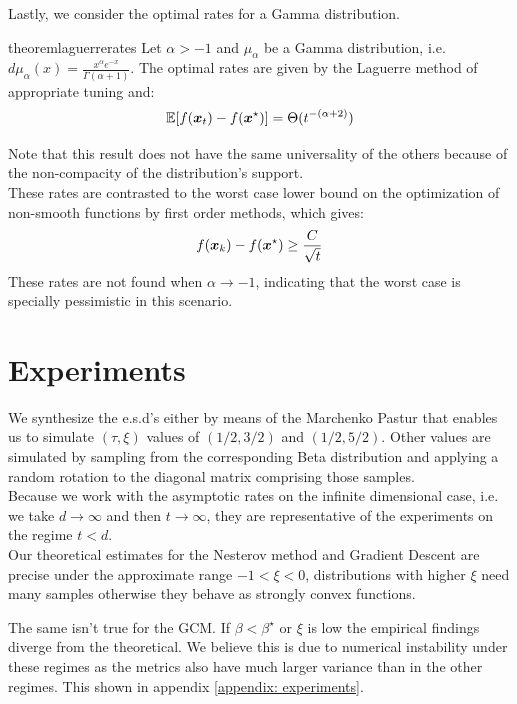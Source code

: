 \documentclass{article}
\begin{document}
Lastly, we consider the optimal rates for a Gamma distribution.

\begin{restatable}{theorem}{laguerrerates}
Let $\alpha>-1$ and $\mu_\alpha$ be a Gamma distribution, i.e. $d\mu_\alpha(x)=\frac{x^\alpha e^{-x}}{\Gamma(\alpha+1)}$. The optimal rates are given by the Laguerre method of appropriate tuning and:
\begin{equation}
    \mathbb{E}[f({\boldsymbol x}_t)-f({\boldsymbol x}^\star)]=\Theta(t^{-(\alpha+2)})
\end{equation}
\end{restatable}
Note that this result does not have the same universality of the others because of the non-compacity of the distribution's support.\\
These rates are contrasted  to the worst case lower bound on the optimization of non-smooth functions by first order methods, which gives:
\begin{equation*}
    f({\boldsymbol x}_k)-f({\boldsymbol x}^\star)\geq\frac{C}{\sqrt{t}}
\end{equation*}
These rates are not found when $\alpha\rightarrow-1$, indicating that the worst case is specially pessimistic in this scenario.


\section{Experiments}

We synthesize the e.s.d's  either by means of the Marchenko Pastur that enables us to simulate $(\tau,\xi)$ values of $(1/2,3/2)$ and $(1/2,5/2)$. Other values are simulated by sampling from the corresponding Beta distribution and applying a random rotation to the diagonal matrix comprising those samples.\\ 
Because we work with the asymptotic rates on the infinite dimensional case, i.e. we take $d\rightarrow \infty$ and then $t \rightarrow \infty$, they are representative of the experiments on the regime $t<d$.\\
Our theoretical estimates for the Nesterov method and Gradient Descent are precise under the approximate  range $-1<\xi<0$, distributions with higher $\xi$ need many samples otherwise they behave as strongly convex functions. 

The same isn't true for the GCM. If $\beta<\beta^\star$ or $\xi$ is low the empirical findings diverge from the theoretical. We believe this is due to numerical instability under these regimes as the metrics also have  much larger variance than in the other regimes. This shown in appendix \ref{appendix: experiments}.  
\end{document}
